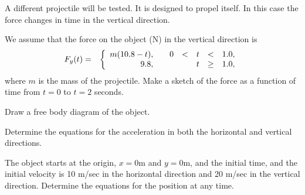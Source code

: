 \begin{problem}
\begin{subproblem}
  \end{subproblem}

  \clearpage

\item A different projectile will be tested. It is designed to propel
  itself. In this case the force changes in time in the vertical
  direction.
  \begin{subproblem}
  \item We assume that the force on the object (N) in the vertical
    direction is
      \begin{eqnarray*}
        F_y(t) & = & \left\{
                     \begin{array}{r@{\hspace{2em}}rcccl}
                       m(10.8-t), & 0 & < & t & < & 1.0, \\
                       9.8,       &   &   & t & \geq & 1.0,
                     \end{array}
                     \right.
      \end{eqnarray*}
      where $m$ is the mass of the projectile.
      Make a sketch of the force as a function of time from $t=0$ to
      $t=2$ seconds. 
      \vfill

    \item Draw a free body diagram of the object.
      \vfill

    \item Determine the equations for the acceleration in both the
      horizontal and vertical directions.

      \vfill

      \clearpage

    \item The object starts at the origin, $x=0$m and $y=0$m, and the
      initial time, and the initial velocity is 10 m/sec in the
      horizontal direction and 20 m/sec in the vertical
      direction. Determine the equations for the position at any time.

      \vfill

  \end{subproblem}

\end{problem}

